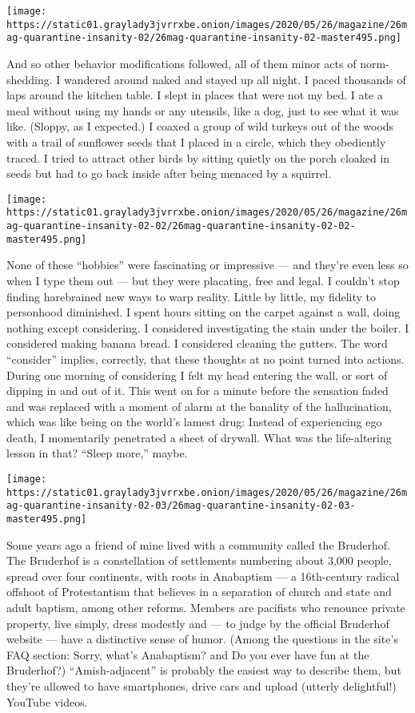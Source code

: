 \texttt{[image: https://static01.graylady3jvrrxbe.onion/images/2020/05/26/magazine/26mag-quarantine-insanity-02/26mag-quarantine-insanity-02-master495.png]}

And so other behavior modifications followed, all of them minor acts of
norm-shedding. I wandered around naked and stayed up all night. I paced
thousands of laps around the kitchen table. I slept in places that were
not my bed. I ate a meal without using my hands or any utensils, like a
dog, just to see what it was like. (Sloppy, as I expected.) I coaxed a
group of wild turkeys out of the woods with a trail of sunflower seeds
that I placed in a circle, which they obediently traced. I tried to
attract other birds by sitting quietly on the porch cloaked in seeds but
had to go back inside after being menaced by a squirrel.

\texttt{[image: https://static01.graylady3jvrrxbe.onion/images/2020/05/26/magazine/26mag-quarantine-insanity-02-02/26mag-quarantine-insanity-02-02-master495.png]}

None of these ``hobbies'' were fascinating or impressive --- and they're
even less so when I type them out --- but they were placating, free and
legal. I couldn't stop finding harebrained new ways to warp reality.
Little by little, my fidelity to personhood diminished. I spent hours
sitting on the carpet against a wall, doing nothing except considering.
I considered investigating the stain under the boiler. I considered
making banana bread. I considered cleaning the gutters. The word
``consider'' implies, correctly, that these thoughts at no point turned
into actions. During one morning of considering I felt my head entering
the wall, or sort of dipping in and out of it. This went on for a minute
before the sensation faded and was replaced with a moment of alarm at
the banality of the hallucination, which was like being on the world's
lamest drug: Instead of experiencing ego death, I momentarily penetrated
a sheet of drywall. What was the life-altering lesson in that? ``Sleep
more,'' maybe.

\texttt{[image: https://static01.graylady3jvrrxbe.onion/images/2020/05/26/magazine/26mag-quarantine-insanity-02-03/26mag-quarantine-insanity-02-03-master495.png]}

Some years ago a friend of mine lived with a community called the
Bruderhof. The Bruderhof is a constellation of settlements numbering
about 3,000 people, spread over four continents, with roots in
Anabaptism --- a 16th-century radical offshoot of Protestantism that
believes in a separation of church and state and adult baptism, among
other reforms. Members are pacifists who renounce private property, live
simply, dress modestly and --- to judge by the official Bruderhof
website --- have a distinctive sense of humor. (Among the questions in
the site's FAQ section: Sorry, what's Anabaptism? and Do you ever have
fun at the Bruderhof?) ``Amish-adjacent'' is probably the easiest way to
describe them, but they're allowed to have smartphones, drive cars and
upload (utterly delightful!) YouTube videos.

